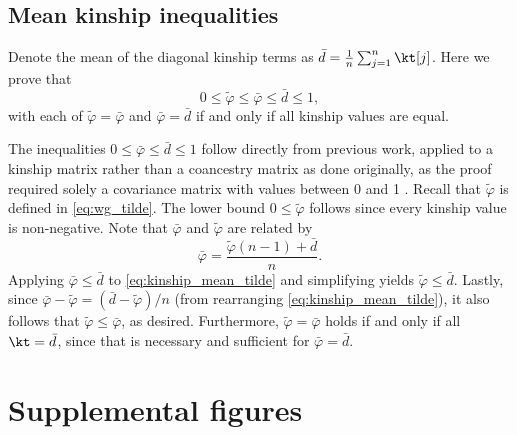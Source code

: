 \documentclass[11pt]{article}
\newcommand{\beginsupplement}{%
  \setcounter{table}{0}
  \renewcommand{\thetable}{S\arabic{table}}%
  \setcounter{figure}{0}
  \renewcommand{\thefigure}{S\arabic{figure}}%
  \setcounter{section}{0}
  \renewcommand{\thesection}{S\arabic{section}}%
  \setcounter{equation}{0}
  \renewcommand{\theequation}{S\arabic{equation}}%
  \setcounter{page}{1}
  \renewcommand{\thepage}{S\arabic{page}}%
}
\begin{document}
\begin{appendices}
  \section{Mean kinship inequalities}

  \label{sec:mean_kinship_ineqs}

  Denote the mean of the diagonal kinship terms as $\bar{d} = \frac{1}{n} \sum_{j=1}^n \kt[j]$.
  Here we prove that
  $$
  0 \le \tilde{\varphi} \le \bar{\varphi} \le \bar{d} \le 1,
  $$
  with each of $\tilde{\varphi} = \bar{\varphi}$ and $\bar{\varphi}= \bar{d}$ if and only if all kinship values are equal.

  The inequalities $0 \le \bar{\varphi} \le \bar{d} \le 1$ follow directly from previous work, applied to a kinship matrix rather than a coancestry matrix as done originally, as the proof required solely a covariance matrix with values between 0 and 1 \citep{ochoa_estimating_2021}.
  Recall that $\tilde{\varphi}$ is defined in \cref{eq:wg_tilde}.
  The lower bound $0 \le \tilde{\varphi}$ follows since every kinship value is non-negative.
  Note that $\bar{\varphi}$ and $\tilde{\varphi}$ are related by
  \begin{equation}
    \label{eq:kinship_mean_tilde}
    \bar{\varphi}
    =
    \frac{ \tilde{\varphi}(n-1) + \bar{d} }{n}.
  \end{equation}
  Applying $\bar{\varphi} \le \bar{d}$ to \cref{eq:kinship_mean_tilde} and simplifying yields $\tilde{\varphi} \le \bar{d}$.
  Lastly, since $\bar{\varphi} - \tilde{\varphi} = ( \bar{d}-\tilde{\varphi} ) / n$ (from rearranging \cref{eq:kinship_mean_tilde}), it also follows that $\tilde{\varphi} \le \bar{\varphi}$, as desired.
  Furthermore, $\tilde{\varphi} = \bar{\varphi}$ holds if and only if all $\kt = \bar{d}$, since that is necessary and sufficient for $\bar{\varphi} = \bar{d}$.

\end{appendices}




\clearpage

\beginsupplement

\section*{Supplemental figures}
\end{document}
